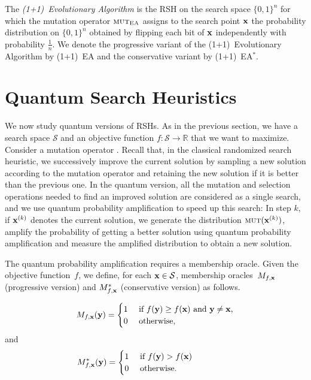 \documentclass[a4paper,11pt]{article}
\begin{document}
\begin{algorithm}[(1+1)~EA and (1+1)~EA$^*$]\label{alg:ooea}
The \emph{(1+1)~Evolutionary Algorithm} is the RSH on the search space $\{0,1\}^n$ for which the mutation operator $\textsc{mut}_{\mathrm{EA}}$ assigns to the search point $\xvec$ the probability distribution on $\{0,1\}^n$ obtained by flipping each bit of $\xvec$ independently with probability $\frac{1}{n}$.
 We denote the progressive variant of the (1+1)~Evolutionary Algorithm by (1+1)~EA and the conservative variant by (1+1)~EA$^*$.
 \end{algorithm}

\section{Quantum Search Heuristics}
\label{sec:qsh}
We now study quantum versions of RSHs. As in the previous section, we have a search space $\mathcal{S}$ and an objective function $f\colon \mathcal{S} \to \mathbb{R}$ that we want to maximize. Consider a mutation operator \mut. Recall that, in the classical randomized search heuristic, we successively improve the current solution by sampling a new solution according to the mutation operator \mut and retaining the new solution if it is better than the previous one. In the quantum version, all the mutation and selection operations needed to find an improved solution are considered as a single search, and we use quantum probability amplification to speed up this search: In step $k$, if $\xvec[k]$ denotes the current solution, we generate the distribution $\mut(\xvec[k])$, amplify the probability of getting a better solution using quantum probability amplification and measure the amplified distribution to obtain a new solution.

The quantum probability amplification requires a membership oracle. Given the objective function~$f$, we define, for each $\xvec \in \mathcal{S}$, membership oracles~$M_{f,\xvec}$ (progressive version) and $M_{f,\xvec}^*$ (conservative version) as follows.

\[
M_{f,\xvec}(\yvec) = \begin{cases}
 1 & \textrm{ if } f(\yvec) \geq f(\xvec)\textrm{ and } \yvec \neq \xvec\textrm{,}\\
 0 & \textrm{ otherwise, }\\
 \end{cases}
\]
and 
\[
M_{f,\xvec}^*(\yvec) = \begin{cases}
 1 & \textrm{ if } f(\yvec) > f(\xvec)\phantom{\textrm{ and } \yvec \neq \xvec}\textrm{}\\
 0 & \textrm{ otherwise. }\\
\end{cases}
\] 
\end{document}
